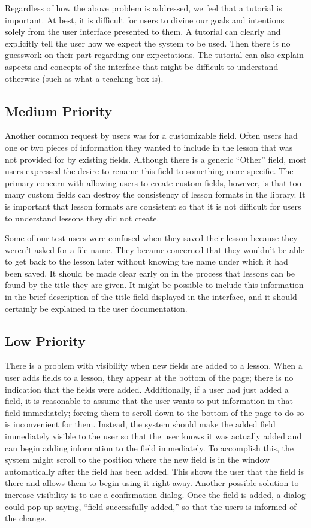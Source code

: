 \documentclass[10pt,letter]{article}
\begin{document}
Regardless of how the above problem is addressed, we feel that a tutorial is
important. At best, it is difficult for users to divine our goals and intentions
solely from the user interface presented to them. A tutorial can clearly and
explicitly tell the user how we expect the system to be used. Then there is no
guesswork on their part regarding our expectations. The tutorial can also
explain aspects and concepts of the interface that might be difficult to
understand otherwise (such as what a teaching box is).

\subsection{Medium Priority}
Another common request by users was for a customizable field. Often users had
one or two pieces of information they wanted to include in the lesson that was
not provided for by existing fields. Although there is a generic ``Other''
field, most users expressed the desire to rename this field to something more
specific. The primary concern with allowing users to create custom fields,
however, is that too many custom fields can destroy the consistency of lesson
formats in the library. It is important that lesson formats are consistent so
that it is not difficult for users to understand lessons they did not create.

Some of our test users were confused when they saved their lesson because they
weren't asked for a file name. They became concerned that they wouldn't be able
to get back to the lesson later without knowing the name under which it had been
saved. It should be made clear early on in the process that lessons can be found
by the title they are given. It might be possible to include this information in
the brief description of the title field displayed in the interface, and it
should certainly be explained in the user documentation.

\subsection{Low Priority}
There is a problem with visibility when new fields are added to a lesson. When
a user adds fields to a lesson, they appear at the bottom of the page; there is
no indication that the fields were added. Additionally, if a user had just added
a field, it is reasonable to assume that the user wants to put information in
that field immediately; forcing them to scroll down to the bottom of the page to
do so is inconvenient for them. Instead, the system should make the added field
immediately visible to the user so that the user knows it was actually added and
can begin adding information to the field immediately. To accomplish this, the
system might scroll to the position where the new field is in the window
automatically after the field has been added. This shows the user that the field
is there and allows them to begin using it right away. Another possible solution
to increase visibility is to use a confirmation dialog. Once the field is added,
a dialog could pop up saying, ``field successfully added,'' so that the users is
informed of the change.
\end{document}
